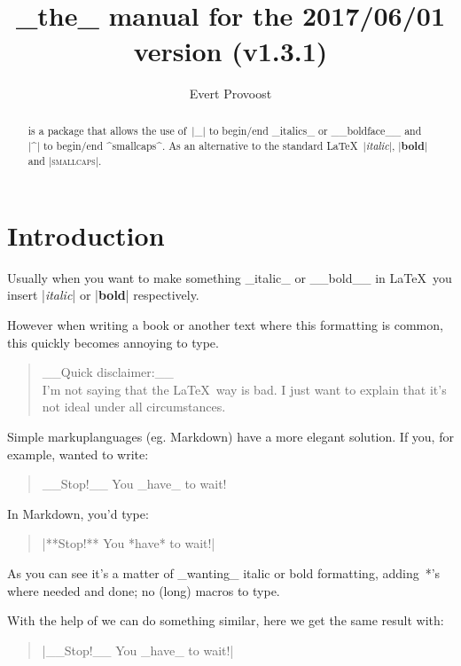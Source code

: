 \documentclass[11pt, cm-default]{l3doc}
\title{\pkg{easyformat}\\[.5em]
		\large _the_ manual for the 2017/06/01 version (v1.3.1)}
\author{Evert Provoost}
\date{}
\begin{document}
	\maketitle
	
	\begin{abstract}
		 is a package that allows the use of~|_| to begin/end _italics_ or __boldface__ and |^| to begin/end ^smallcaps^. As an alternative to the standard \LaTeX\ |\textit{italic}|, |\textbf{bold}| and |\textsc{smallcaps}|.
	\end{abstract}

	\tableofcontents
	\newpage
	
	
	\section{Introduction}
	Usually when you want to make something _italic_ or __bold__ in \LaTeX\ you insert |\textit{italic}| or |\textbf{bold}| respectively.
	
	However when writing a book or another text where this formatting is common, this quickly becomes annoying to type.

	\begin{quote}
	__Quick disclaimer:__\\
	I'm not saying that the \LaTeX\ way is bad. I just want to explain that it's not ideal under all circumstances.
	\end{quote}
	
	Simple markuplanguages (eg. Markdown) have a more elegant solution.	
	If you, for example, wanted to write:
	\begin{quote}
		__Stop!__ You _have_ to wait!
	\end{quote}

	In Markdown, you'd type:
	\begin{quote}
		|**Stop!** You *have* to wait!|
	\end{quote}

	As you can see it's a matter of _wanting_ italic or bold formatting, adding~*'s where needed and done; no (long) macros to type.
	
	With the help of  we can do something similar, here we get the same result with:
	\begin{quote}
		|__Stop!__ You _have_ to wait!|
	\end{quote}
	
\end{document}
